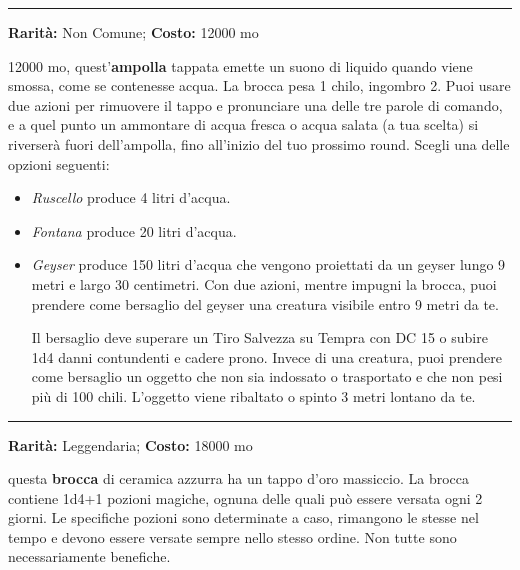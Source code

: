 \begin{multicols}{2}
\smallskip\noindent\rule{\linewidth}{2pt}  \hypertarget{Broccadell'AcquaInfinita}{}\medskip{}\noindent\label{Broccadell'AcquaInfinita}

\textbf{Rarità:} Non Comune; \textbf{Costo:} 12000 mo

12000 mo, quest'\textbf{ampolla} tappata emette un suono di liquido quando viene smossa, come se contenesse acqua. La brocca pesa 1 chilo, ingombro 2. Puoi usare due azioni per rimuovere il tappo e pronunciare una delle tre parole di comando, e a quel punto un ammontare di acqua fresca o acqua salata (a tua scelta) si riverserà fuori dell'ampolla, fino all'inizio del tuo prossimo round. Scegli una delle opzioni seguenti:

\begin{itemize}[leftmargin=*] \setlength{\itemsep}{0pt}
\item
\emph{Ruscello} produce 4 litri d'acqua.
\item
\emph{Fontana} produce 20 litri d'acqua.
\item
\emph{Geyser} produce 150 litri d'acqua che vengono proiettati da un geyser lungo 9 metri e largo 30 centimetri. Con due azioni, mentre impugni la brocca, puoi prendere come bersaglio del geyser una creatura visibile entro 9 metri da te.

Il bersaglio deve superare un Tiro Salvezza su Tempra con DC 15 o subire 1d4 danni contundenti e cadere prono. Invece di una creatura, puoi prendere come bersaglio un oggetto che non sia indossato o trasportato e che non pesi più di 100 chili. L'oggetto viene ribaltato o spinto 3 metri lontano da te.
\end{itemize}

\smallskip\noindent\rule{\linewidth}{2pt}  \hypertarget{BroccadellePozioni}{}\medskip{}\noindent\label{BroccadellePozioni}

\textbf{Rarità:} Leggendaria; \textbf{Costo:} 18000 mo

questa \textbf{brocca} di ceramica azzurra ha un tappo d'oro massiccio. La brocca contiene 1d4+1 pozioni magiche, ognuna delle quali può essere versata ogni 2 giorni. Le specifiche pozioni sono determinate a caso, rimangono le stesse nel tempo e devono essere versate sempre nello stesso ordine. Non tutte sono necessariamente benefiche.


\end{multicols}
